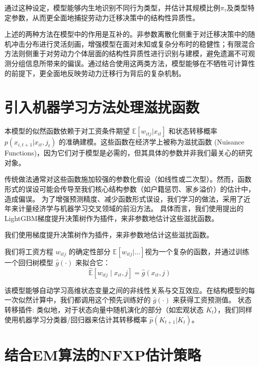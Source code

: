 \documentclass[
  a4paper,
  zihao=-4,
  fontset=mac,
  AutoFakeBold,
  AutoFakeSlant,
  oneside]{ctexbook}
\begin{document}
通过这种设定，模型能够内生地识别不同行为类型，并估计其规模比例$\pi_\tau$及类型特定参数，从而更全面地捕捉劳动力迁移决策中的结构性异质性。

上述的两种方法在模型中的作用是互补的。非参数离散化侧重于对迁移决策中的随机冲击分布进行灵活刻画，增强模型在面对未知或复杂分布时的稳健性；有限混合方法则侧重于对劳动力个体层面的结构性异质性进行识别与建模，避免遗漏不可观测分组信息所带来的偏误。通过结合使用这两类方法，模型能够在不牺牲可计算性的前提下，更全面地反映劳动力迁移行为背后的复杂机制。





\section{引入机器学习方法处理滋扰函数} 
\label{sec:ml_plugins}



本模型的似然函数依赖于对工资条件期望 $\mathbb{E}[w_{itj} | x_{it}]$ 和状态转移概率 $p(x_{i,t+1} | x_{it}, j_t)$ 的准确建模。这些函数在经济学上被称为滋扰函数 (Nuisance Functions)，因为它们对于模型是必需的，但其具体的参数并非我们最关心的研究对象。

传统做法通常对这些函数施加较强的参数化假设（如线性或二次型）。然而，函数形式的误设可能会传导至我们核心结构参数（如户籍惩罚、家乡溢价）的估计中，造成偏误。
为了增强预测精度、减少函数形式误设，我们学习\textcite{atheyGeneralizedRandomForests2019}的做法，采用了近年来计量经济学与机器学习交叉领域的前沿方法。
具体而言，我们使用\textcite{keLightGBMHighlyEfficient2017}提出的LightGBM梯度提升决策树作为插件，来非参数地估计这些滋扰函数。

我们使用梯度提升决策树作为插件，来非参数地估计这些滋扰函数。

我们将工资方程 $w_{itj}$ 的确定性部分 $\mathbb{E}[w_{itj} | ...] $视为一个复杂的函数，并通过训练一个回归树模型 $\hat{g}(\cdot)$ 来拟合它：
\begin{equation}
\hat{\mathbb{E}}[w_{itj} \mid x_{it}, j] = \hat{g}(x_{it}, j)
\end{equation}

该模型能够自动学习高维状态变量之间的非线性关系与交互效应。在结构模型的每一次似然计算中，我们都调用这个预先训练好的 $\hat{g}(\cdot)$ 来获得工资预测值。
状态转移插件: 类似地，对于状态向量中随机演化的部分（如宏观状态 $K_t$），我们同样使用机器学习分类器/回归器来估计其转移概率 $\hat{p}(K_{t+1} | K_t)$。




\section{结合EM算法的NFXP估计策略}
\end{document}
